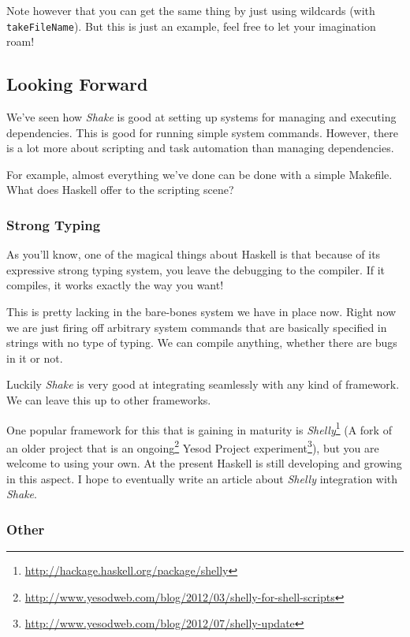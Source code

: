 \documentclass[]{article}
\renewcommand{\href}[2]{#2\footnote{\url{#1}}}
\begin{document}
Note however that you can get the same thing by just using wildcards (with
\texttt{takeFileName}). But this is just an example, feel free to let your
imagination roam!

\hypertarget{looking-forward}{%
\subsection{Looking Forward}\label{looking-forward}}

We've seen how \emph{Shake} is good at setting up systems for managing and
executing dependencies. This is good for running simple system commands.
However, there is a lot more about scripting and task automation than managing
dependencies.

For example, almost everything we've done can be done with a simple Makefile.
What does Haskell offer to the scripting scene?

\hypertarget{strong-typing}{%
\subsubsection{Strong Typing}\label{strong-typing}}

As you'll know, one of the magical things about Haskell is that because of its
expressive strong typing system, you leave the debugging to the compiler. If it
compiles, it works exactly the way you want!

This is pretty lacking in the bare-bones system we have in place now. Right now
we are just firing off arbitrary system commands that are basically specified in
strings with no type of typing. We can compile anything, whether there are bugs
in it or not.

Luckily \emph{Shake} is very good at integrating seamlessly with any kind of
framework. We can leave this up to other frameworks.

One popular framework for this that is gaining in maturity is
\href{http://hackage.haskell.org/package/shelly}{\emph{Shelly}} (A fork of an
older project that is an
\href{http://www.yesodweb.com/blog/2012/03/shelly-for-shell-scripts}{ongoing}
Yesod Project
\href{http://www.yesodweb.com/blog/2012/07/shelly-update}{experiment}), but you
are welcome to using your own. At the present Haskell is still developing and
growing in this aspect. I hope to eventually write an article about
\emph{Shelly} integration with \emph{Shake}.

\hypertarget{other}{%
\subsubsection{Other}\label{other}}
\end{document}
